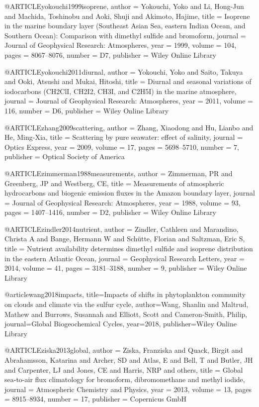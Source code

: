 @ARTICLE{yokouchi1999isoprene,
  author = {Yokouchi, Yoko and Li, Hong-Jun and Machida, Toshinobu and Aoki,
	Shuji and Akimoto, Hajime},
  title = {Isoprene in the marine boundary layer (Southeast Asian Sea, eastern
	Indian Ocean, and Southern Ocean): Comparison with dimethyl sulfide
	and bromoform},
  journal = {Journal of Geophysical Research: Atmospheres},
  year = {1999},
  volume = {104},
  pages = {8067--8076},
  number = {D7},
  publisher = {Wiley Online Library}
}

@ARTICLE{yokouchi2011diurnal,
  author = {Yokouchi, Yoko and Saito, Takuya and Ooki, Atsushi and Mukai, Hitoshi},
  title = {Diurnal and seasonal variations of iodocarbons (CH2ClI, CH2I2, CH3I,
	and C2H5I) in the marine atmosphere},
  journal = {Journal of Geophysical Research: Atmospheres},
  year = {2011},
  volume = {116},
  number = {D6},
  publisher = {Wiley Online Library}
}

@ARTICLE{zhang2009scattering,
  author = {Zhang, Xiaodong and Hu, Lianbo and He, Ming-Xia},
  title = {Scattering by pure seawater: effect of salinity},
  journal = {Optics Express},
  year = {2009},
  volume = {17},
  pages = {5698--5710},
  number = {7},
  publisher = {Optical Society of America}
}

@ARTICLE{zimmerman1988measurements,
  author = {Zimmerman, PR and Greenberg, JP and Westberg, CE},
  title = {Measurements of atmospheric hydrocarbons and biogenic emission fluxes
	in the Amazon boundary layer},
  journal = {Journal of Geophysical Research: Atmospheres},
  year = {1988},
  volume = {93},
  pages = {1407--1416},
  number = {D2},
  publisher = {Wiley Online Library}
}

@ARTICLE{zindler2014nutrient,
  author = {Zindler, Cathleen and Marandino, Christa A and Bange, Hermann W and
	Sch{\"u}tte, Florian and Saltzman, Eric S},
  title = {Nutrient availability determines dimethyl sulfide and isoprene distribution
	in the eastern Atlantic Ocean},
  journal = {Geophysical Research Letters},
  year = {2014},
  volume = {41},
  pages = {3181--3188},
  number = {9},
  publisher = {Wiley Online Library}
}

@article{wang2018impacts,
  title={Impacts of shifts in phytoplankton community on clouds and climate via the sulfur cycle},
  author={Wang, Shanlin and Maltrud, Mathew and Burrows, Susannah and Elliott, Scott and Cameron-Smith, Philip},
  journal={Global Biogeochemical Cycles},
  year={2018},
  publisher={Wiley Online Library}
}

@ARTICLE{ziska2013global,
  author = {Ziska, Franziska and Quack, Birgit and Abrahamsson, Katarina and
	Archer, SD and Atlas, E and Bell, T and Butler, JH and Carpenter,
	LJ and Jones, CE and Harris, NRP and others},
  title = {Global sea-to-air flux climatology for bromoform, dibromomethane
	and methyl iodide},
  journal = {Atmospheric Chemistry and Physics},
  year = {2013},
  volume = {13},
  pages = {8915--8934},
  number = {17},
  publisher = {Copernicus GmbH}
}

